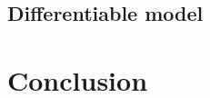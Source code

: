 \documentclass{article}
\begin{document}
\subsection{Differentiable model}


\section{Conclusion}


%
%
%
%


%
%
%
%
%
%
%
%
\end{document}
